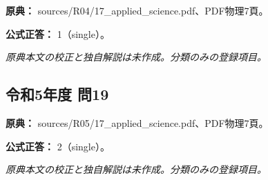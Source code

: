 \noindent\textbf{原典：} sources/R04/17\_applied\_science.pdf、PDF物理7頁。

\textbf{公式正答：} 1（single）。

\par\textit{原典本文の校正と独自解説は未作成。分類のみの登録項目。}

\subsection{令和5年度 問19}
\label{q:r05-reg-applied-19}

\noindent\textbf{原典：} sources/R05/17\_applied\_science.pdf、PDF物理7頁。

\textbf{公式正答：} 2（single）。

\par\textit{原典本文の校正と独自解説は未作成。分類のみの登録項目。}

